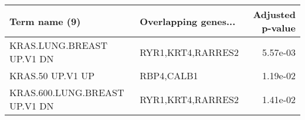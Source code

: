 \begin{tabular}{llr}
\toprule
                Term name (9) & Overlapping genes... &  Adjusted p-value \\
\midrule
    KRAS.LUNG.BREAST UP.V1 DN &    RYR1,KRT4,RARRES2 &          5.57e-03 \\
             KRAS.50 UP.V1 UP &           RBP4,CALB1 &          1.19e-02 \\
KRAS.600.LUNG.BREAST UP.V1 DN &    RYR1,KRT4,RARRES2 &          1.41e-02 \\
\bottomrule
\end{tabular}
